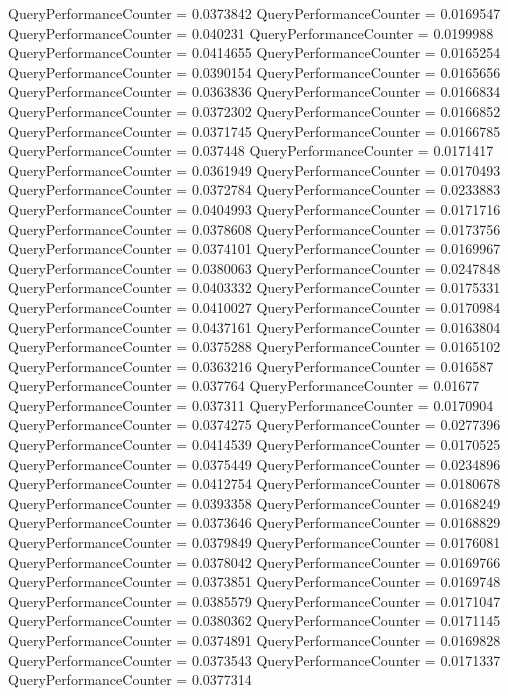 \documentclass[9pt]{article}
\theoremstyle{plain}
\theoremstyle{definition}
\theoremstyle{remark}
\numberwithin{equation}{section}
\begin{document}
QueryPerformanceCounter  =  0.0373842
QueryPerformanceCounter  =  0.0169547
QueryPerformanceCounter  =  0.040231
QueryPerformanceCounter  =  0.0199988
QueryPerformanceCounter  =  0.0414655
QueryPerformanceCounter  =  0.0165254
QueryPerformanceCounter  =  0.0390154
QueryPerformanceCounter  =  0.0165656
QueryPerformanceCounter  =  0.0363836
QueryPerformanceCounter  =  0.0166834
QueryPerformanceCounter  =  0.0372302
QueryPerformanceCounter  =  0.0166852
QueryPerformanceCounter  =  0.0371745
QueryPerformanceCounter  =  0.0166785
QueryPerformanceCounter  =  0.037448
QueryPerformanceCounter  =  0.0171417
QueryPerformanceCounter  =  0.0361949
QueryPerformanceCounter  =  0.0170493
QueryPerformanceCounter  =  0.0372784
QueryPerformanceCounter  =  0.0233883
QueryPerformanceCounter  =  0.0404993
QueryPerformanceCounter  =  0.0171716
QueryPerformanceCounter  =  0.0378608
QueryPerformanceCounter  =  0.0173756
QueryPerformanceCounter  =  0.0374101
QueryPerformanceCounter  =  0.0169967
QueryPerformanceCounter  =  0.0380063
QueryPerformanceCounter  =  0.0247848
QueryPerformanceCounter  =  0.0403332
QueryPerformanceCounter  =  0.0175331
QueryPerformanceCounter  =  0.0410027
QueryPerformanceCounter  =  0.0170984
QueryPerformanceCounter  =  0.0437161
QueryPerformanceCounter  =  0.0163804
QueryPerformanceCounter  =  0.0375288
QueryPerformanceCounter  =  0.0165102
QueryPerformanceCounter  =  0.0363216
QueryPerformanceCounter  =  0.016587
QueryPerformanceCounter  =  0.037764
QueryPerformanceCounter  =  0.01677
QueryPerformanceCounter  =  0.037311
QueryPerformanceCounter  =  0.0170904
QueryPerformanceCounter  =  0.0374275
QueryPerformanceCounter  =  0.0277396
QueryPerformanceCounter  =  0.0414539
QueryPerformanceCounter  =  0.0170525
QueryPerformanceCounter  =  0.0375449
QueryPerformanceCounter  =  0.0234896
QueryPerformanceCounter  =  0.0412754
QueryPerformanceCounter  =  0.0180678
QueryPerformanceCounter  =  0.0393358
QueryPerformanceCounter  =  0.0168249
QueryPerformanceCounter  =  0.0373646
QueryPerformanceCounter  =  0.0168829
QueryPerformanceCounter  =  0.0379849
QueryPerformanceCounter  =  0.0176081
QueryPerformanceCounter  =  0.0378042
QueryPerformanceCounter  =  0.0169766
QueryPerformanceCounter  =  0.0373851
QueryPerformanceCounter  =  0.0169748
QueryPerformanceCounter  =  0.0385579
QueryPerformanceCounter  =  0.0171047
QueryPerformanceCounter  =  0.0380362
QueryPerformanceCounter  =  0.0171145
QueryPerformanceCounter  =  0.0374891
QueryPerformanceCounter  =  0.0169828
QueryPerformanceCounter  =  0.0373543
QueryPerformanceCounter  =  0.0171337
QueryPerformanceCounter  =  0.0377314
\end{document}
